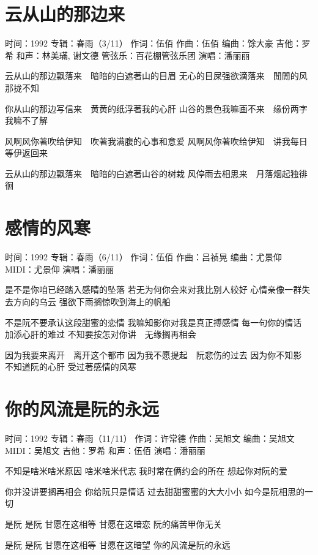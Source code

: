 \documentclass[UTF8,a4paper,oneside,twocolumn,12pt]{ctexbook}
\newcommand{\infopair}[2]{\textbullet #1：#2}
\newcommand{\zc}[1][伍佰]{\infopair{作词}{#1}}
\newcommand{\zq}[1][伍佰]{\infopair{作曲}{#1}}
\newcommand{\bq}[1][伍佰]{\infopair{编曲}{#1}}
\newcommand{\zj}[1]{\infopair{专辑}{#1}}
\newcommand{\sj}[1]{\infopair{时间}{#1}}
\newenvironment{info}{\begin{flushleft}\kaishu
	}
	{\end{flushleft}\normalsize\yahei\par}
\newenvironment{lyric}{
	}
{}
\begin{document}
\section{云从山的那边来}
\begin{info}
	\sj{1992}
	\zj{春雨（3/11）}
	\zc
	\zq
	\bq[馀大豪]
	\infopair{吉他}{罗希}
	\infopair{和声}{林美璊, 谢文德}
	\infopair{管弦乐}{百花棚管弦乐团}
	\infopair{演唱}{潘丽丽}
\end{info}
\begin{lyric}
	云从山的那边飘落来　暗暗的白遮著山的目眉
	无心的目屎强欲滴落来　閒閒的风那拢不知

	你从山的那边写信来　黄黄的纸浮著我的心肝
	山谷的景色我嘛画不来　缘份两字我嘛不了解

	风啊风你著吹给伊知　吹著我满腹的心事和意爱
	风啊风你著吹给伊知　讲我每日等伊返回来

	云从山的那边飘落来　暗暗的白遮著山谷的树栽
	风停雨去相思来　月落烟起独徘徊
\end{lyric}

\section{感情的风寒}
\begin{info}
	\sj{1992}
	\zj{春雨（6/11）}
	\zc
	\zq[吕祯晃]
	\bq[尤景仰]
	\infopair{MIDI}{尤景仰}
	\infopair{演唱}{潘丽丽}
\end{info}
\begin{lyric}
	是不是你咱已经踏入感晴的坠落
	若无为何你会来对我比别人较好
	心情亲像一群失去方向的乌云
	强欲下雨搁惊吹到海上的帆船

	不是阮不要承认这段甜蜜的恋情
	我嘛知影你对我是真正搏感情
	每一句你的情话　加添心肝的难过
	不知要按怎对你讲　无缘搁再相会

	因为我要来离开　离开这个都市
	因为我不愿提起　阮悲伤的过去
	因为你不知影　不知道阮的心肝
	受过著感情的风寒
\end{lyric}

\section{你的风流是阮的永远}
\begin{info}
	\sj{1992}
	\zj{春雨（11/11）}
	\zc[许常德]
	\zq[吴旭文]
	\bq[吴旭文]
	\infopair{MIDI}{吴旭文}
	\infopair{吉他}{罗希}
	\infopair{和声}{伍佰}
	\infopair{演唱}{潘丽丽}
\end{info}
\begin{lyric}
	不知是啥米啥米原因 啥米啥米代志
	我时常在俩约会的所在 想起你对阮的爱

	你并没讲要搁再相会 你给阮只是情话
	过去甜甜蜜蜜的大大小小 如今是阮相思的一切

	是阮 是阮 甘愿在这相等 甘愿在这暗恋
	阮的痛苦甲你无关

	是阮 是阮 甘愿在这相等 甘愿在这暗望
	你的风流是阮的永远
\end{lyric}
\end{document}
